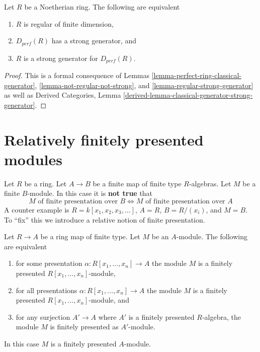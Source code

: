 \begin{proposition}
\label{proposition-regular-strong-generator}
Let $R$ be a Noetherian ring. The following are equivalent
\begin{enumerate}
\item $R$ is regular of finite dimension,
\item $D_{perf}(R)$ has a strong generator, and
\item $R$ is a strong generator for $D_{perf}(R)$.
\end{enumerate}
\end{proposition}

\begin{proof}
This is a formal consequence of
Lemmas \ref{lemma-perfect-ring-classical-generator},
\ref{lemma-not-regular-not-strong}, and
\ref{lemma-regular-strong-generator}
as well as Derived Categories, Lemma
\ref{derived-lemma-classical-generator-strong-generator}.
\end{proof}







\section{Relatively finitely presented modules}
\label{section-relative-finite-presentation}

\noindent
Let $R$ be a ring. Let $A \to B$ be a finite map of finite type $R$-algebras.
Let $M$ be a finite $B$-module. In this case it is {\bf not true} that
$$
M\text{ of finite presentation over }B
\Leftrightarrow
M\text{ of finite presentation over }A
$$
A counter example is $R = k[x_1, x_2, x_3, \ldots]$, $A = R$, $B = R/(x_i)$,
and $M = B$. To ``fix'' this we introduce a relative notion of finite
presentation.

\begin{lemma}
\label{lemma-relatively-finitely-presented}
Let $R \to A$ be a ring map of finite type.
Let $M$ be an $A$-module.
The following are equivalent
\begin{enumerate}
\item for some presentation $\alpha : R[x_1, \ldots, x_n] \to A$
the module $M$ is a finitely presented $R[x_1, \ldots, x_n]$-module,
\item for all presentations $\alpha : R[x_1, \ldots, x_n] \to A$
the module $M$ is a finitely presented $R[x_1, \ldots, x_n]$-module, and
\item for any surjection $A' \to A$ where $A'$ is a finitely presented
$R$-algebra, the module $M$ is finitely presented as $A'$-module.
\end{enumerate}
In this case $M$ is a finitely presented $A$-module.
\end{lemma}

